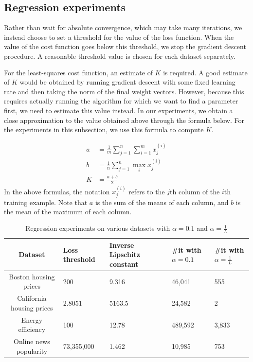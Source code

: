 \documentclass{article}
\begin{document}
\subsection{Regression experiments} \label{regexpts}
Rather than wait for absolute convergence, which may take many iterations, we instead choose to set a threshold for the value of the loss function. When the value of the cost function goes below this threshold, we stop the gradient descent procedure. A reasonable threshold value is chosen for each dataset separately.

For the least-squares cost function, an estimate of $K$ is required. A good estimate of $K$ would be obtained by running gradient descent with some fixed learning rate and then taking the norm of the final weight vectors. However, because this requires actually running the algorithm for which we want to find a parameter first, we need to estimate this value instead. In our experiments, we obtain a close approximation to the value obtained above through the formula below. For the experiments in this subsection, we use this formula to compute $K$.

\[
    \begin{aligned}
        a &= \frac{1}{m}\sum\limits_{j=1}^n \sum\limits_{i=1}^m x^{(i)}_j \\
        b &= \frac{1}{n}\sum\limits_{j=1}^n \max\limits_i x^{(i)}_j \\
        K &= \frac{a+b}{2}
    \end{aligned}
\]
In the above formulas, the notation $x^{(i)}_j$ refers to the $j$th column of the $i$th training example. Note that $a$ is the sum of the means of each column, and $b$ is the mean of the maximum of each column.

\begin{table}
    \caption{Regression experiments on various datasets with $\alpha=0.1$ and $\alpha=\frac{1}{L}$}
    \centering
    \begin{tabularx}{\textwidth}{cYYYY}
        \toprule
        Dataset & Loss threshold & Inverse Lipschitz constant & \#it with $\alpha=0.1$ & \#it with $\alpha=\frac{1}{L}$ \\
        \midrule
        Boston housing prices & 200 & 9.316 & 46,041 & 555 \\
        California housing prices & 2.8051 & 5163.5 & 24,582 & 2 \\
        Energy efficiency \cite{tsanas2012accurate} & 100 & 12.78 & 489,592 & 3,833 \\
        Online news popularity \cite{fernandes2015proactive} & 73,355,000 & 1.462 & 10,985 & 753 \\
        \bottomrule
     \end{tabularx}
    \label{tab:leastsq:1}
\end{table}
\end{document}
